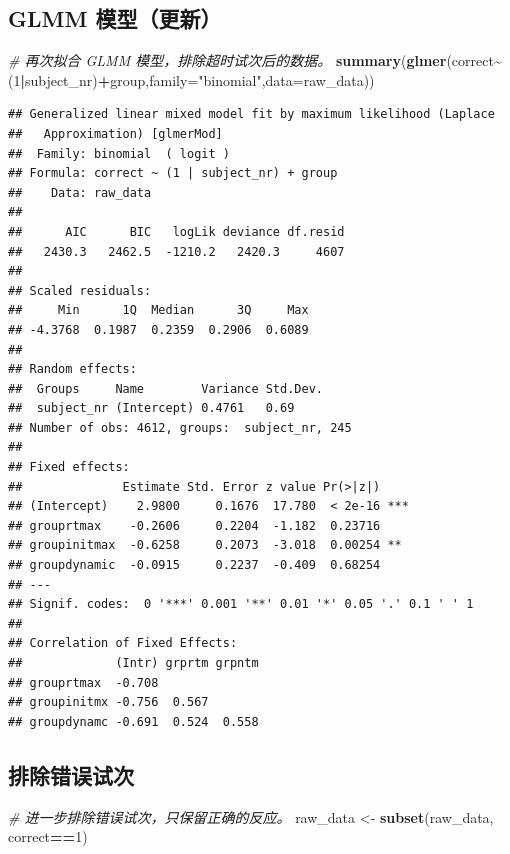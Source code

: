 \documentclass[
]{article}
\newenvironment{Shaded}{\begin{snugshade}}{\end{snugshade}}
\newcommand{\AttributeTok}[1]{\textcolor[rgb]{0.13,0.29,0.53}{#1}}
\newcommand{\CommentTok}[1]{\textcolor[rgb]{0.56,0.35,0.01}{\textit{#1}}}
\newcommand{\DecValTok}[1]{\textcolor[rgb]{0.00,0.00,0.81}{#1}}
\newcommand{\FunctionTok}[1]{\textcolor[rgb]{0.13,0.29,0.53}{\textbf{#1}}}
\newcommand{\NormalTok}[1]{#1}
\newcommand{\OtherTok}[1]{\textcolor[rgb]{0.56,0.35,0.01}{#1}}
\newcommand{\SpecialCharTok}[1]{\textcolor[rgb]{0.81,0.36,0.00}{\textbf{#1}}}
\newcommand{\StringTok}[1]{\textcolor[rgb]{0.31,0.60,0.02}{#1}}
\begin{document}
\subsection{GLMM 模型（更新）}\label{glmm-ux6a21ux578bux66f4ux65b0}

\begin{Shaded}
\begin{Highlighting}[]
\CommentTok{\# 再次拟合 GLMM 模型，排除超时试次后的数据。}
\FunctionTok{summary}\NormalTok{(}\FunctionTok{glmer}\NormalTok{(correct}\SpecialCharTok{\textasciitilde{}}\NormalTok{(}\DecValTok{1}\SpecialCharTok{|}\NormalTok{subject\_nr)}\SpecialCharTok{+}\NormalTok{group,}\AttributeTok{family=}\StringTok{"binomial"}\NormalTok{,}\AttributeTok{data=}\NormalTok{raw\_data))}
\end{Highlighting}
\end{Shaded}

\begin{verbatim}
## Generalized linear mixed model fit by maximum likelihood (Laplace
##   Approximation) [glmerMod]
##  Family: binomial  ( logit )
## Formula: correct ~ (1 | subject_nr) + group
##    Data: raw_data
## 
##      AIC      BIC   logLik deviance df.resid 
##   2430.3   2462.5  -1210.2   2420.3     4607 
## 
## Scaled residuals: 
##     Min      1Q  Median      3Q     Max 
## -4.3768  0.1987  0.2359  0.2906  0.6089 
## 
## Random effects:
##  Groups     Name        Variance Std.Dev.
##  subject_nr (Intercept) 0.4761   0.69    
## Number of obs: 4612, groups:  subject_nr, 245
## 
## Fixed effects:
##              Estimate Std. Error z value Pr(>|z|)    
## (Intercept)    2.9800     0.1676  17.780  < 2e-16 ***
## grouprtmax    -0.2606     0.2204  -1.182  0.23716    
## groupinitmax  -0.6258     0.2073  -3.018  0.00254 ** 
## groupdynamic  -0.0915     0.2237  -0.409  0.68254    
## ---
## Signif. codes:  0 '***' 0.001 '**' 0.01 '*' 0.05 '.' 0.1 ' ' 1
## 
## Correlation of Fixed Effects:
##             (Intr) grprtm grpntm
## grouprtmax  -0.708              
## groupinitmx -0.756  0.567       
## groupdynamc -0.691  0.524  0.558
\end{verbatim}

\subsection{排除错误试次}\label{ux6392ux9664ux9519ux8befux8bd5ux6b21}

\begin{Shaded}
\begin{Highlighting}[]
\CommentTok{\# 进一步排除错误试次，只保留正确的反应。}
\NormalTok{raw\_data }\OtherTok{\textless{}{-}} \FunctionTok{subset}\NormalTok{(raw\_data, correct}\SpecialCharTok{==}\DecValTok{1}\NormalTok{)}
\end{Highlighting}
\end{Shaded}
\end{document}
